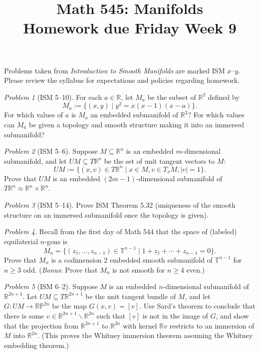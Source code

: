 \documentclass[11pt,twoside]{amsart}
\title{Math 545: Manifolds\\ Homework due Friday Week 9}
\theoremstyle{plain}
\theoremstyle{remark}
\newtheorem{prob}{Problem}
\theoremstyle{definition}
\theoremstyle{definition}
\newcommand{\RR}{\mathbb{R}}
\newcommand{\PP}{\mathbb{P}}
\newcommand{\TT}{\mathbb{T}}
\begin{document}
\maketitle

\noindent Problems taken from \emph{Introduction to Smooth Manifolds} are marked ISM $x$--$y$. Please review the syllabus for expectations and policies regarding homework.

\begin{prob}[ISM 5--10]
For each $a\in \RR$, let $M_a$ be the subset of $\RR^2$ defined by
\[
  M_a := \{(x,y)\mid y^2=x(x-1)(x-a)\}.
\]
For which values of $a$ is $M_a$ an embedded submanifold of $\RR^2$? For which values can $M_a$ be given a topology and smooth structure making it into an immersed submanifold?
\end{prob}

\begin{prob}[ISM 5--6]
Suppose $M\subseteq \RR^n$ is an embedded $m$-dimensional submanifold, and let $UM\subseteq T\RR^n$ be the set of unit tangent vectors to $M$:
\[
  UM := \{(x,v)\in T\RR^n\mid x\in M, v\in T_xM, |v|=1\}.
\]
Prove that $UM$ is an embedded $(2m-1)$-dimensional submanifold of $T\RR^n\approx \RR^n\times \RR^n$.
\end{prob}

\begin{prob}[ISM 5--14]
Prove ISM Theorem 5.32 (uniqueness of the smooth structure on an immersed submanifold once the topology is given).
\end{prob}

\begin{prob}
Recall from the first day of Math 544 that the space of (labeled) equilaterial $n$-gons is
\[
  M_n = \{(z_1,\ldots,z_{n-1})\in \TT^{n-1}\mid 1+z_1+\cdots+z_{n-1}=0\}.
\]
Prove that $M_n$ is a codimension $2$ embedded smooth submanifold of $\TT^{n-1}$ for $n\ge 3$ odd. (\emph{Bonus}: Prove that $M_n$ is not smooth for $n\ge 4$ even.)
\end{prob}

\begin{prob}[ISM 6--2]
Suppose $M$ is an embedded $n$-dimensional submanifold of $\RR^{2n+1}$. Let $UM
\subseteq T\RR^{2n+1}$ be the unit tangent bundle of $M$, and let $G\colon UM\to \RR\PP^{2n}$ be the map $G(x,v) = [v]$. Use Sard's theorem to conclude that there is some $v\in \RR^{2n+1}\smallsetminus \RR^{2n}$ such that $[v]$ is not in the image of $G$, and show that the projection from $\RR^{2n+1}$ to $\RR^{2n}$ with kernel $\RR v$ restricts to an immersion of $M$ into $\RR^{2n}$. (This proves the Whitney immersion theorem assuming the Whitney embedding theorem.)
\end{prob}
\end{document}
